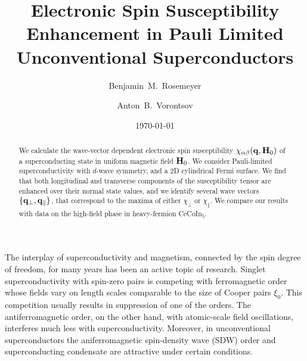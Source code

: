 \documentclass[aps,prl,twocolumn,showpacs,amsmath,amssymb]{revtex4-1}
\newcommand{\cecoin}{CeCoIn$_5$}
\begin{document}
\title{Electronic Spin Susceptibility Enhancement in Pauli Limited Unconventional Superconductors}

\author{Benjamin~M.~Rosemeyer}
\author{Anton~B.~Vorontsov}


\date{\today}

\begin{abstract}
%
We calculate the wave-vector dependent electronic spin susceptibility 
$\chi_{\alpha\beta}({\bf q}, {\bf H}_0)$ 
of a superconducting state in uniform magnetic field ${\bf H}_0$. 
We consider Pauli-limited superconductivity with $d$-wave symmetry, and a 2D cylindrical 
Fermi surface.  
We find that both longitudinal and transverse components of the susceptibility tensor are enhanced over their
normal state values, 
and we identify several wave vectors $\{{\bf q}_\perp,{\bf q}_\parallel\}$, 
that correspond to the maxima of either $\chi_\perp$ or $\chi_\parallel$. 
We compare our results with data on the high-field phase in heavy-fermion \cecoin. 
%
\end{abstract} 



\maketitle


%
The interplay of superconductivity and magnetism, connected by the spin degree of freedom, 
for many years has been an active topic of research.
Singlet superconductivity with spin-zero pairs is competing with ferromagnetic order whose 
fields vary on length scales comparable to the size of Cooper pairs $\xi_0$.
This competition usually results in suppression of one of the orders. \cite{bulaevskii85}
The antiferromagnetic order, on the other hand, with atomic-scale field oscillations, 
interferes much less with superconductivity.\cite{anderson_suhl59} 
Moreover, in unconventional superconductors the aniferromagnetic spin-density wave (SDW) order 
and superconducting condensate are attractive under certain conditions.\cite{machida87_sdw_hf,*kato87_sdw_hf}
\end{document}
